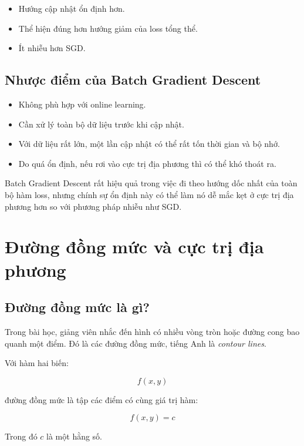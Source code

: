 \documentclass[12pt,a4paper]{report}
\begin{document}
\begin{itemize}
    \item Hướng cập nhật ổn định hơn.
    \item Thể hiện đúng hơn hướng giảm của loss tổng thể.
    \item Ít nhiễu hơn SGD.
\end{itemize}

\section{Nhược điểm của Batch Gradient Descent}

\begin{itemize}
    \item Không phù hợp với online learning.
    \item Cần xử lý toàn bộ dữ liệu trước khi cập nhật.
    \item Với dữ liệu rất lớn, một lần cập nhật có thể rất tốn thời gian và bộ nhớ.
    \item Do quá ổn định, nếu rơi vào cực trị địa phương thì có thể khó thoát ra.
\end{itemize}

\begin{luuy}
Batch Gradient Descent rất hiệu quả trong việc đi theo hướng dốc nhất của toàn bộ hàm loss, nhưng chính sự ổn định này có thể làm nó dễ mắc kẹt ở cực trị địa phương hơn so với phương pháp nhiễu như SGD.
\end{luuy}

\chapter{Đường đồng mức và cực trị địa phương}

\section{Đường đồng mức là gì?}

Trong bài học, giảng viên nhắc đến hình có nhiều vòng tròn hoặc đường cong bao quanh một điểm. Đó là các đường đồng mức, tiếng Anh là \textit{contour lines}.

Với hàm hai biến:

\[
    f(x,y)
\]

đường đồng mức là tập các điểm có cùng giá trị hàm:

\[
    f(x,y)=c
\]

Trong đó $c$ là một hằng số.
\end{document}
